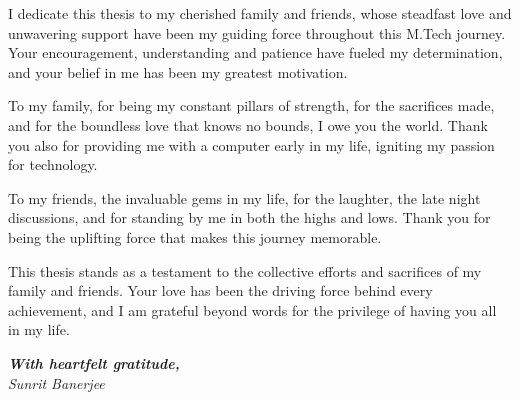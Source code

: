 \thispagestyle{empty} 

\begin{justify}
I dedicate this thesis to my cherished family and friends, whose steadfast love and unwavering support have been my guiding force throughout this M.Tech journey. 
Your encouragement, understanding and patience have fueled my determination, and your belief in me has been my greatest motivation.

\vspace{0.4cm}

To my family, for being my constant pillars of strength, for the sacrifices made, and for the boundless love that knows no bounds, I owe you the world. Thank you also for providing me with a computer early in my life, igniting my passion for technology.

\vspace{0.4cm}

To my friends, the invaluable gems in my life, for the laughter, the late night discussions, and for standing by me in both the highs and lows. Thank you for being the uplifting force that makes this journey memorable.

\vspace{0.4cm}

This thesis stands as a testament to the collective efforts and sacrifices of my family and friends. Your love has been the driving force behind every achievement, and I am grateful beyond words for the privilege of having you all in my life.
\end{justify}

\vspace{2cm}

\begin{flushright}
\textbf{\textit{With heartfelt gratitude,}}\\
\textit{Sunrit Banerjee}
\end{flushright}